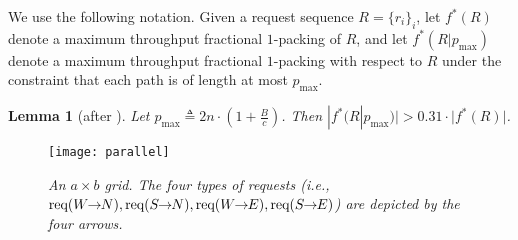 \documentclass[11pt]{article}
\newtheorem{lemma}[theorem]{Lemma}
\newcommand{\pmax}{p_{\max}}
\newenvironment{proof sketch}[1]{\noindent {\emph{Proof sketch of #1:}}}{\hfill \qed}
\newcommand{\ppp}[2]{\text{\rm req}(#1\!\!\rightarrow\!\!#2)}
\begin{document}
We use the following notation. Given a request sequence $R=\{r_i\}_i$, let
$f^*(R)$ denote a maximum throughput fractional $1$-packing of $R$, and let
$f^*(R|\pmax)$ denote a maximum throughput fractional $1$-packing with respect to
$R$ under the constraint that each path is of length at most $\pmax$.
\begin{lemma}[after \cite{AZ}]\label{lemma:nB}
  Let $\pmax\triangleq 2n \cdot (1+\frac{B}{c})$.  Then $|f^*(R| \pmax)|
>0.31\cdot |f^*(R)|$.
\end{lemma}

\begin{figure}[t]
      \centering
        \texttt{[image: parallel]}
        \caption{\em An $a \times b$  grid. The four types
        of requests (i.e., $\ppp{W}{N}, \ppp{S}{N}, \ppp{W}{E}, \ppp{S}{E}$) are depicted
        by the four arrows.}
      \label{fig:crossbar}
    \end{figure}
\end{document}
